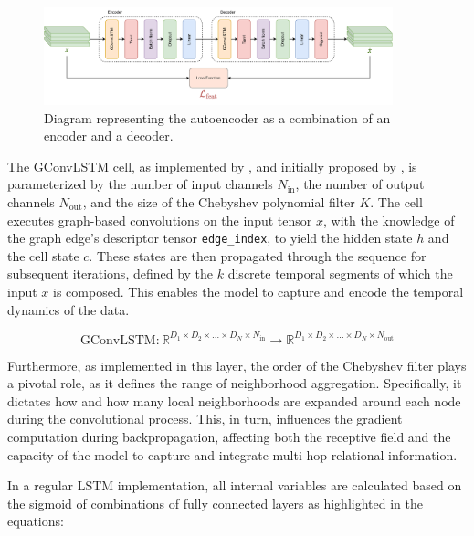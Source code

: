 \begin{figure}[!ht]
\noindent\hspace{0.5mm}\includegraphics[width=0.9\textwidth]{./figures/Autoencoder.pdf}
\caption{Diagram representing the autoencoder as a combination of an encoder and a decoder.}
\label{fig:autoencoder}
\end{figure}



The \gls{GConvLSTM} cell, as implemented by \cite{rozemberczki2021pytorch}, and initially proposed by \cite{Seo_2018}, is parameterized by the number of input channels $N_{\text{in}}$, the number of output channels $N_{\text{out}}$, and the size of the Chebyshev polynomial filter $K$. The cell executes graph-based convolutions on the input tensor $x$, with the knowledge of the graph edge's descriptor tensor \texttt{edge\_index}, to yield the hidden state $h$ and the cell state $c$. These states are then propagated through the sequence for subsequent iterations, defined by the $k$ discrete temporal segments of which the input $x$ is composed. This enables the model to capture and encode the temporal dynamics of the data.

\begin{equation}
    \text{GConvLSTM}: \mathbb{R}^{D_1 \times D_2 \times \ldots \times D_N \times N_{\text{in}}} \rightarrow \mathbb{R}^{D_1 \times D_2 \times \ldots \times D_N \times N_{\text{out}}}
\end{equation}

Furthermore, as implemented in this layer, the order of the Chebyshev filter plays a pivotal role, as it defines the range of neighborhood aggregation. Specifically, it dictates how and how many local neighborhoods are expanded around each node during the convolutional process. This, in turn, influences the gradient computation during backpropagation, affecting both the receptive field and the capacity of the model to capture and integrate multi-hop relational information.

In a regular \gls{LSTM} implementation, all internal variables are calculated based on the sigmoid of combinations of fully connected layers as highlighted in the equations:

